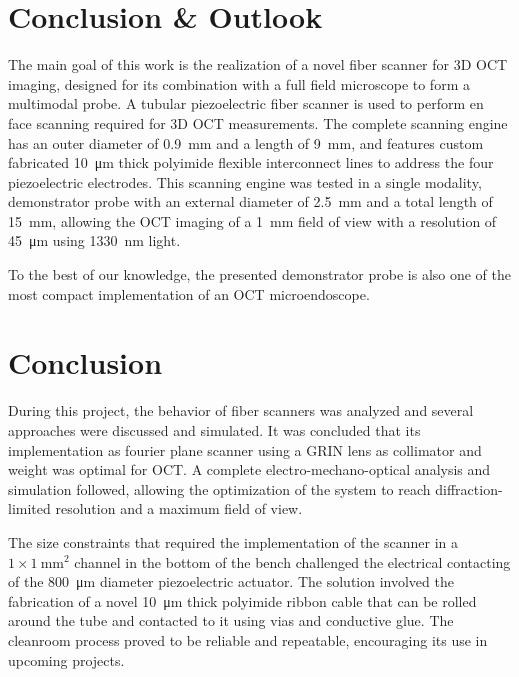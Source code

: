 \documentclass[10pt]{iopart}
\begin{document}
\section{Conclusion \& Outlook}


The main goal of this work is the realization of a novel fiber scanner for 3D OCT imaging, designed for its combination with a full field microscope to form a multimodal probe. A tubular piezoelectric fiber scanner is used to perform en face scanning required for 3D OCT measurements. The complete scanning engine has an outer diameter of \SI{0.9}{\milli\meter} and a length of \SI{9}{\milli\meter}, and features custom fabricated \SI{10}{\micro\meter} thick polyimide flexible interconnect lines to address the four piezoelectric electrodes. This scanning engine was tested in a single modality, demonstrator probe with an external diameter of \SI{2.5}{\milli\meter} and a total length of \SI{15}{\milli\meter}, allowing the OCT imaging of a \SI{1}{\milli\meter} field of view with a resolution of \SI{45}{\micro\meter} using \SI{1330}{\nano\meter} light. 

To the best of our knowledge, the presented demonstrator probe is also one of the most compact implementation of an OCT microendoscope.

\section{Conclusion}
During this project, the behavior of fiber scanners was analyzed and several approaches were discussed and simulated. It was concluded that its implementation as fourier plane scanner using a GRIN lens as collimator and weight was optimal for OCT. A complete electro-mechano-optical analysis and simulation followed, allowing the optimization of the system to reach diffraction-limited resolution and a maximum field of view.

The size constraints that required the implementation of the scanner in a $1\times \SI{1}{\milli\meter^2}$ channel in the bottom of the bench challenged the electrical contacting of the \SI{800}{\micro\meter} diameter piezoelectric actuator. The solution involved the fabrication of a novel \SI{10}{\micro\meter} thick polyimide ribbon cable that can be rolled around the tube and contacted to it using vias and conductive glue. The cleanroom process proved to be reliable and repeatable, encouraging its use in upcoming projects.
\end{document}
